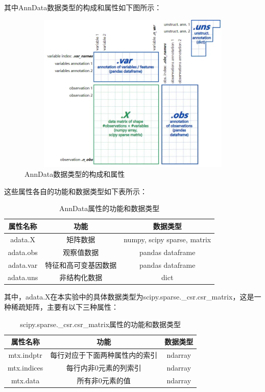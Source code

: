 \documentclass {article}
\begin{document}
		其中AnnData数据类型的构成和属性如下图所示：
		\label{构成和属性}
		\begin{figure}[H]
			\centering
			\includegraphics[width=4.5in,height=3in]{figures/fig1.png}
			\caption{AnnData数据类型的构成和属性}
		\end{figure}
	
		这些属性各自的功能和数据类型如下表所示：
		\begin{table}[H]
			\caption{AnnData属性的功能和数据类型}
			\centering
			\begin{tabular}{ccc}
				\hline
				属性名称      & 功能         & 数据类型                                               \\ \hline
				adata.X   & 矩阵数据       & numpy, scipy sparse, matrix \\ 
				adata.obs & 观察值数据      & pandas dataframe                                   \\ 
				adata.var & 特征和高可变基因数据 & pandas dataframe                                   \\ 
				adata.uns & 非结构化数据     & dict                                               \\ \hline
			\end{tabular}
		\end{table}
	
		其中，adata.X在本实验中的具体数据类型为scipy.sparse.\_csr.csr\_matrix，这是一种稀疏矩阵，主要有以下三种属性：
		\begin{table}[H]
			\caption{scipy.sparse.\_csr.csr\_matrix属性的功能和数据类型}
			\centering
			\begin{tabular}{ccc}
				\hline
				属性名称        & 功能              & 数据类型    \\ \hline
				mtx.indptr  & 每行对应于下面两种属性内的索引 & ndarray \\ 
				mtx.indices & 每行内非0元素的列索引     & ndarray \\ 
				mtx.data    & 所有非0元素的值        & ndarray \\ \hline
			\end{tabular}
		\end{table}
	
\end{document}
